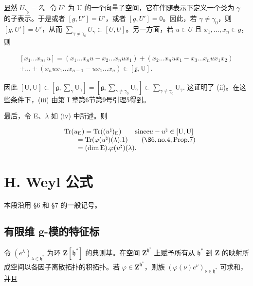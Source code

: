 显然 \(U_{\gamma_{0}} = Z\)。令 \(U'\) 为 U 的一个向量子空间，它在伴随表示下定义一个类为 \(\gamma\) 的子表示。于是或者 \([g, U'] = U'\)，或者 \([g, U'] = 0\)。因此，若 \(\gamma \neq \gamma_{0}\)，则 \([g, U'] = U'\)，从而 \(\sum_{\gamma \neq \gamma_{0}} U_{\gamma} \subset [U, U]\)。另一方面，若 \(u \in U\) 且 \(x_{1}, \ldots, x_{n} \in g\)，则

\[
\begin{array}{c} [ x _ {1} \ldots x _ {n}, u ] = (x _ {1} \ldots x _ {n} u - x _ {2} \ldots x _ {n} u x _ {1}) + (x _ {2} \ldots x _ {n} u x _ {1} - x _ {3} \ldots x _ {n} u x _ {1} x _ {2}) \\ + \dots + (x _ {n} u x _ {1} \ldots x _ {n - 1} - u x _ {1} \ldots x _ {n}) \in [ \mathfrak {g}, \mathrm{U} ]. \end{array}
\]

因此 \([\mathrm{U},\mathrm{U}]\subset \left[\mathfrak{g},\sum_{\gamma}\mathrm{U}_{\gamma}\right] = \left[\mathfrak{g},\sum_{\gamma \neq \gamma_0}\mathrm{U}_\gamma \right]\subset \sum_{\gamma \neq \gamma_0}\mathrm{U}_\gamma .\) 这证明了 (ii)。在这些条件下，(iii) 由第 I 章第6节第9号引理5得到。

最后，令 E、\(\lambda\) 如 (iv) 中所述。则

\[
\begin{array}{r l} & {\mathrm{Tr} (u _ {\mathrm{E}}) = \mathrm{Tr} ((u ^ {\natural}) _ {\mathrm{E}}) \qquad \text {since} u - u ^ {\natural} \in [ \mathrm{U}, \mathrm{U} ]} \\ & {\qquad = \mathrm{Tr} (\varphi (u ^ {\natural}) (\lambda). 1) \qquad (\S 6, \text {no.} 4, \text {Prop.} 7)} \\ & {\qquad = (\dim \mathrm{E}). \varphi (u ^ {\natural}) (\lambda).} \end{array}
\]

\section{H. Weyl 公式}

本段沿用 §6 和 §7 的一般记号。

\subsection{有限维 g-模的特征标}

令 \((e^{\lambda})_{\lambda \in \mathfrak{h}^{*}}\) 为环 \(\mathbf{Z}[\mathfrak{h}^*]\) 的典则基。在空间 \(\mathbf{Z}^{\mathfrak{h}^*}\) 上赋予所有从 \(\mathfrak{h}^*\) 到 \(\mathbf{Z}\) 的映射所成空间以各因子离散拓扑的积拓扑。若 \(\varphi \in \mathbf{Z}^{\mathfrak{h}^*}\)，则族 \((\varphi (\nu)e^{\nu})_{\nu \in \mathfrak{h}^*}\) 可求和，并且

